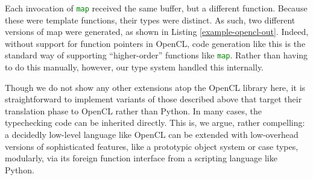 \documentclass{sigplanconf}
\newcommand{\lip}[1]{\lstinline[language=Python,basicstyle=\ttfamily\small,deletendkeywords={tuple,buffer,map}]{#1}}
\begin{document}
Each invocation of \lip{map} received the same buffer, but a different function. Because these were template functions, their types were distinct. As such, two different versions of map were generated, as shown in Listing \ref{example-opencl-out}. Indeed, without support for function pointers in OpenCL, code generation like this is the standard way of supporting ``higher-order'' functions like \lip{map}. Rather than having to do this manually, however, our type system handled this internally. 

Though we do not show any other extensions atop the OpenCL library here, it is straightforward to implement variants of those described above that target their translation phase to OpenCL rather than Python. In many cases, the typechecking code can be inherited directly. This is, we argue, rather compelling: a decidedly low-level language like OpenCL can be extended with low-overhead versions of sophisticated features, like a prototypic object system or case types, modularly, via its foreign function interface from a scripting language like Python.
\end{document}
